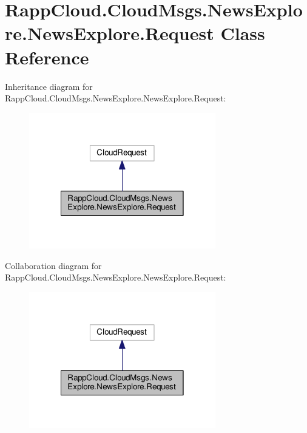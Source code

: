 \hypertarget{classRappCloud_1_1CloudMsgs_1_1NewsExplore_1_1NewsExplore_1_1Request}{\section{Rapp\-Cloud.\-Cloud\-Msgs.\-News\-Explore.\-News\-Explore.\-Request Class Reference}
\label{classRappCloud_1_1CloudMsgs_1_1NewsExplore_1_1NewsExplore_1_1Request}
}


Inheritance diagram for Rapp\-Cloud.\-Cloud\-Msgs.\-News\-Explore.\-News\-Explore.\-Request\-:
\nopagebreak
\begin{figure}[H]
\begin{center}
\leavevmode
\includegraphics[width=230pt]{classRappCloud_1_1CloudMsgs_1_1NewsExplore_1_1NewsExplore_1_1Request__inherit__graph}
\end{center}
\end{figure}


Collaboration diagram for Rapp\-Cloud.\-Cloud\-Msgs.\-News\-Explore.\-News\-Explore.\-Request\-:
\nopagebreak
\begin{figure}[H]
\begin{center}
\leavevmode
\includegraphics[width=230pt]{classRappCloud_1_1CloudMsgs_1_1NewsExplore_1_1NewsExplore_1_1Request__coll__graph}
\end{center}
\end{figure}
